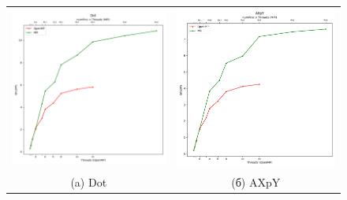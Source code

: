 \documentclass[12pt, a4paper]{article}
\begin{document}
\begin{figure}[H]
	\center
	\begin{tabular}{cc}
		\includegraphics[width=85mm]{compare_dot} & \includegraphics[width=85mm]{compare_axpy} \\
		(a) Dot & (б) AXpY \\

\end{tabular}
\end{figure}
\end{document}
